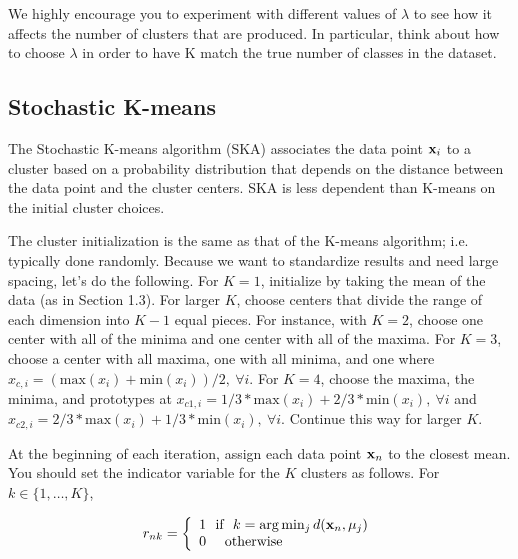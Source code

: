 \documentclass[11pt]{article}
\newcommand{\vxi}{{\bf x}_i}
\newcommand{\vxn}{{\bf x}_n}
\newcommand{\vmuj}{{\bf \mu}_j}
\begin{document}
We highly encourage you to experiment with different values of $\lambda$ to see how it affects the number of clusters that are produced.  In particular, think about how to choose $\lambda$ in order to have K match the true number of classes in the dataset.

\subsection{Stochastic K-means}
The Stochastic K-means algorithm (SKA) associates the data point $\vxi$ to a cluster based on a probability distribution that depends on the distance between the data point and the cluster centers. SKA is less dependent than K-means on the initial cluster choices.

The cluster initialization is the same as that of the K-means algorithm; i.e. typically done randomly.  Because we want to standardize results and need large spacing, let's do the following.  For $K=1$, initialize by taking the mean of the data (as in Section 1.3).  For larger $K$, choose centers that divide the range of each dimension into $K-1$ equal pieces.  For instance, with $K=2$, choose one center with 
all of the minima and one center with all of the maxima.  For $K=3$, choose a center with all maxima, one with all minima, and one where $x_{c, i} = (\mathrm{max}(x_i) + \mathrm{min}(x_i))/2, \ \forall i$.  For $K=4$, choose the maxima, the minima, and prototypes at $x_{c1, i} = 1/3*\mathrm{max}(x_i) + 2/3*\mathrm{min}(x_i), \ \forall i$ and $x_{c2, i} = 2/3*\mathrm{max}(x_i) + 1/3*\mathrm{min}(x_i), \ \forall i$.  Continue this way for larger $K$.

At the beginning of each iteration, assign each data point $\vxn$ to the closest mean. You should set the indicator variable for the $K$ clusters as follows. For $k \in \{1,\ldots,K\}$,


\begin{equation}
\label{eq:E4}
r_{nk} =  \left\{
     \begin{array}{lr}
        1~~  \textrm{if} ~~  k = \arg\min_j d(\vxn, \vmuj)  \\
        0 ~~   ~~ \textrm{otherwise}
     \end{array}
   \right.
\end{equation}
\end{document}

